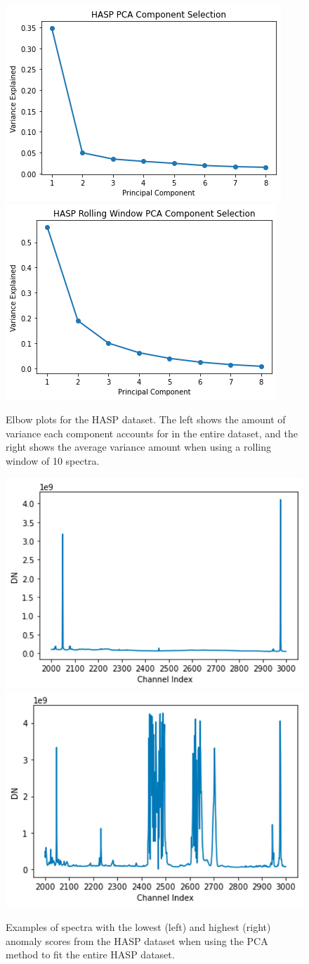 \begin{figure}[b]
    \centering
    \includegraphics[width=0.49\linewidth]{figs/spectra/HASP_Elbow.png}
    \includegraphics[width=0.49\linewidth]{figs/spectra/elbow.png}
    \caption[Elbow Plots for PCA Component Selection with HASP Data]{Elbow plots for the HASP dataset. The left shows the amount of variance each component accounts for in the entire dataset, and the right shows the average variance amount when using a rolling window of 10 spectra.}
    \label{spectra/fig:elbows}
\end{figure}

\begin{figure}
    \centering
    \includegraphics[width=0.49\linewidth]{figs/spectra/hasp1.png}
    \includegraphics[width=0.49\linewidth]{figs/spectra/hasp2.png}
    \caption[The Least and Most Novel Spectra in the HASP Data]{Examples of spectra with the lowest (left) and highest (right) anomaly scores from the HASP dataset when using the PCA method to fit the entire HASP dataset.}
    \label{spectra/fig:hasp}
\end{figure}

